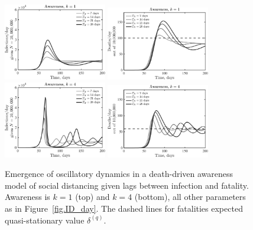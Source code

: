 \begin{figure}[t!]
\begin{center}
\includegraphics[width=0.4\textwidth]{scripts/figseir_Hdel_k1_noname.pdf}
\mbox{\hspace{0.05\textwidth}}
\includegraphics[width=0.4\textwidth]{scripts/figseir_Hdel_k1D_noname.pdf}\\
\includegraphics[width=0.4\textwidth]{scripts/figseir_Hdel_k4_noname.pdf}
\mbox{\hspace{0.05\textwidth}}
\includegraphics[width=0.4\textwidth]{scripts/figseir_Hdel_k4D_noname.pdf}
\caption{Emergence of oscillatory dynamics in a death-driven awareness
model of social distancing given lags between infection and fatality.
Awareness is $k=1$ (top) and $k=4$ (bottom), all other parameters as in Figure~\ref{fig.ID_day}.
The dashed
lines for fatalities expected quasi-stationary value $\delta^{(q)}$.
\label{fig.oscillate_k1-4}}
\end{center}
\end{figure}

